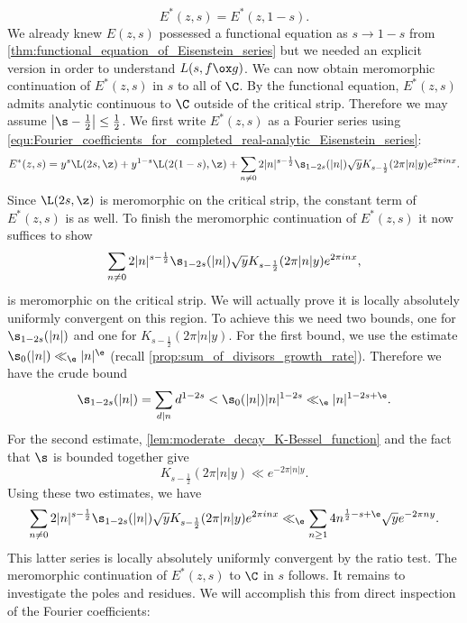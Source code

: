       \[
        E^{\ast}(z,s) = E^{\ast}(z,1-s).
      \]
      We already knew $E(z,s)$ possessed a functional equation as $s \to 1-s$ from \cref{thm:functional_equation_of_Eisenstein_series} but we needed an explicit version in order to understand $L(s,f \ox g)$. We can now obtain meromorphic continuation of $E^{\ast}(z,s)$ in $s$ to all of $\C$. By the functional equation, $E^{\ast}(z,s)$ admits analytic continuous to $\C$ outside of the critical strip. Therefore we may assume $\left|\s-\frac{1}{2}\right| \le \frac{1}{2}$. We first write $E^{\ast}(z,s)$ as a Fourier series using \cref{equ:Fourier_coefficients_for_completed_real-analytic_Eisenstein_series}:
      \[
        E^{\ast}(z,s) = y^{s}\L(2s,\z)+y^{1-s}\L(2(1-s),\z)+\sum_{n \neq 0}2|n|^{s-\frac{1}{2}}\s_{1-2s}(|n|)\sqrt{y}K_{s-\frac{1}{2}}(2\pi|n|y)e^{2\pi inx}.
      \]
      Since $\L(2s,\z)$ is meromorphic on the critical strip, the constant term of $E^{\ast}(z,s)$ is as well. To finish the meromorphic continuation of $E^{\ast}(z,s)$ it now suffices to show
      \[
        \sum_{n \neq 0}2|n|^{s-\frac{1}{2}}\s_{1-2s}(|n|)\sqrt{y}K_{s-\frac{1}{2}}(2\pi|n|y)e^{2\pi inx},
      \]
      is meromorphic on the critical strip. We will actually prove it is locally absolutely uniformly convergent on this region. To achieve this we need two bounds, one for $\s_{1-2s}(|n|)$ and one for $K_{s-\frac{1}{2}}(2\pi|n|y)$. For the first bound, we use the estimate $\s_{0}(|n|) \ll_{\e} |n|^{\e}$ (recall \cref{prop:sum_of_divisors_growth_rate}). Therefore we have the crude bound
      \[
        \s_{1-2s}(|n|) = \sum_{d \mid n}d^{1-2s} < \s_{0}(|n|)|n|^{1-2s} \ll_{\e}|n|^{1-2s+\e}.
      \]
      For the second estimate, \cref{lem:moderate_decay_K-Bessel_function} and the fact that $\s$ is bounded together give
      \[
        K_{s-\frac{1}{2}}(2\pi|n|y) \ll e^{-2\pi|n|y}.
      \]
      Using these two estimates, we have
      \begin{equation}\label{equ:non-constant_Fourier_coefficient_bound_non-holomorphic_Eisenstein_series}
        \sum_{n \neq 0}2|n|^{s-\frac{1}{2}}\s_{1-2s}(|n|)\sqrt{y}K_{s-\frac{1}{2}}(2\pi|n|y)e^{2\pi inx} \ll_{\e} \sum_{n \ge 1}4n^{\frac{1}{2}-s+\e}\sqrt{y}e^{-2\pi ny}.
      \end{equation}
      This latter series is locally absolutely uniformly convergent by the ratio test. The meromorphic continuation of $E^{\ast}(z,s)$ to $\C$ in $s$ follows. It remains to investigate the poles and residues. We will accomplish this from direct inspection of the Fourier coefficients:

